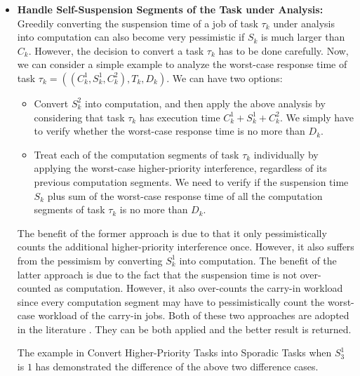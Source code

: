 \begin{itemize}
\item {\bf Handle Self-Suspension Segments of the Task under Analysis:} Greedily converting the suspension time of a job of task $\tau_k$ under analysis into computation can also become very pessimistic if $S_k$ is much larger than $C_k$. However, the decision to convert a task $\tau_k$ has to be done carefully. Now, we can consider a simple example to analyze the worst-case response time of task $\tau_k = ((C_k^1, S_k^1, C_k^2), T_k, D_k)$. We can have two options:
\begin{itemize}
\item Convert $S_k^2$ into computation, and then apply the above analysis by considering that task $\tau_k$ has execution time $C_k^1+S_k^1+C_k^2$. We simply have to verify whether the worst-case response time is no more than $D_k$.
\item Treat each of the computation segments of task $\tau_k$ individually by applying the worst-case higher-priority interference, regardless of its previous computation segments. We need to verify if the suspension time $S_k$ plus sum of the worst-case response time of all the computation segments of task $\tau_k$ is no more than $D_k$. 
\end{itemize}
The benefit of the former approach is due to that it only pessimistically counts the additional higher-priority interference once. However, it also suffers from the pessimism by converting $S_k^1$ into computation. The benefit of the latter approach is due to the fact that the suspension time is not over-counted as computation. However, it also over-counts the carry-in workload since every computation segment may have to pessimistically count the worst-case workload of the carry-in jobs. Both of these two approaches are adopted in the literature \cite{ecrts15nelissen,Huang:multiseg,RTCSA-BletsasA05}. They can be both applied and the better result is returned.

The example in Convert Higher-Priority Tasks into Sporadic Tasks when $S_3^1$ is $1$ has demonstrated the difference of the above two difference cases. 


\end{itemize}
